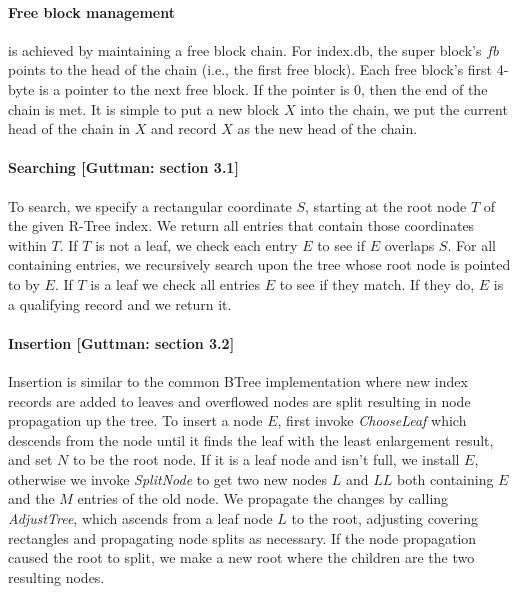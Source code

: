 \documentclass[12pt]{article}
\begin{document}
\paragraph{Free block management} is achieved by maintaining a
free block chain.  For index.db, the super block's $fb$ points to
the head of the chain (i.e., the first free block).  Each free
block's first 4-byte is a pointer to the next free block. If the
pointer is 0, then the end of the chain is met.  It is simple to
put a new block $X$ into the chain, we put the current head of the
chain in $X$ and record $X$ as the new head of the chain.


\paragraph{Searching [Guttman: section 3.1]}
To search, we specify a rectangular coordinate $S$, starting at
the root node $T$ of the given R-Tree index.  We return all
entries that contain those coordinates within $T$. If $T$ is not a
leaf, we check each entry $E$ to see if $E$ overlaps $S$. For all
containing entries, we recursively search upon the tree whose root
node is pointed to by $E$. If $T$ is a leaf we check all entries
$E$ to see if they match.  If they do, $E$ is a qualifying record
and we return it.

\paragraph{Insertion [Guttman: section 3.2]}
Insertion is similar to the common BTree implementation where new
index records are added to leaves and overflowed nodes are split
resulting in node propagation up the tree. To insert a node $E$,
first invoke {\em ChooseLeaf} which descends from the node until
it finds the leaf with the least enlargement result, and set $N$
to be the root node. If it is a leaf node and isn't full, we
install $E$, otherwise we invoke {\em SplitNode} to get two new
nodes $L$ and $LL$ both containing $E$ and the $M$ entries of the
old node.  We propagate the changes by calling {\em AdjustTree},
which ascends from a leaf node $L$ to the root, adjusting covering
rectangles and propagating node splits as necessary. If the node
propagation caused the root to split, we make a new root where the
children are the two resulting nodes.
\end{document}
